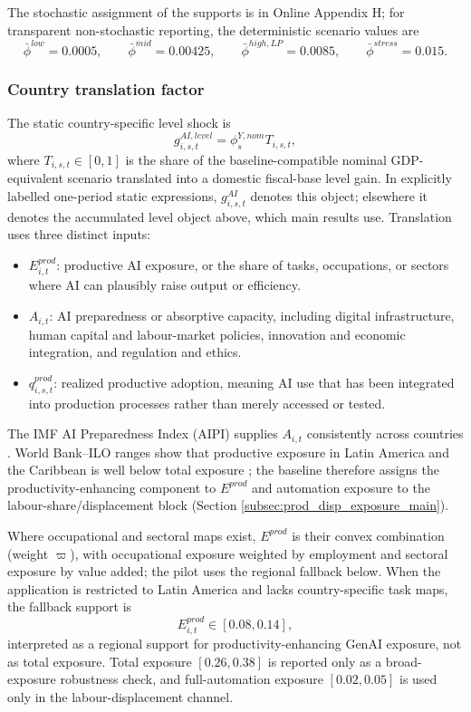 \documentclass[11pt,a4paper]{article}
\begin{document}
The stochastic assignment of the supports is in Online Appendix H; for transparent non-stochastic reporting, the deterministic scenario values are
\begin{equation}
    \bar\phi^{low}=0.0005,
    \qquad
    \bar\phi^{mid}=0.00425,
    \qquad
    \bar\phi^{high,LP}=0.0085,
    \qquad
    \bar\phi^{stress}=0.015.
\end{equation}
\subsubsection{Country translation factor}\label{subsec:translation_factor_main}

The static country-specific level shock is
\begin{equation}
    g^{AI,level}_{i,s,t}=\phi^{Y,nom}_s T_{i,s,t},
\end{equation}
where $T_{i,s,t}\in[0,1]$ is the share of the baseline-compatible nominal GDP-equivalent scenario translated into a domestic fiscal-base level gain. In explicitly labelled one-period static expressions, $g^{AI}_{i,s,t}$ denotes this object; elsewhere it denotes the accumulated level object above, which main results use. Translation uses three distinct inputs:
\begin{itemize}
    \item $E^{prod}_{i,t}$: productive AI exposure, or the share of tasks, occupations, or sectors where AI can plausibly raise output or efficiency.
    \item $A_{i,t}$: AI preparedness or absorptive capacity, including digital infrastructure, human capital and labour-market policies, innovation and economic integration, and regulation and ethics.
    \item $q^{prod}_{i,s,t}$: realized productive adoption, meaning AI use that has been integrated into production processes rather than merely accessed or tested.
\end{itemize}
The IMF AI Preparedness Index (AIPI) supplies $A_{i,t}$ consistently across countries \citep{imf2024aipi,cazzaniga2024genai}. World Bank--ILO ranges show that productive exposure in Latin America and the Caribbean is well below total exposure \citep{worldbankilo2024lacgenai}; the baseline therefore assigns the productivity-enhancing component to $E^{prod}$ and automation exposure to the labour-share/displacement block (Section \ref{subsec:prod_disp_exposure_main}).

Where occupational and sectoral maps exist, $E^{prod}$ is their convex combination (weight $\varpi$), with occupational exposure weighted by employment and sectoral exposure by value added; the pilot uses the regional fallback below.
When the application is restricted to Latin America and lacks country-specific task maps, the fallback support is
\begin{equation}
    E^{prod}_{i,t}\in[0.08,0.14],
\end{equation}
interpreted as a regional support for productivity-enhancing GenAI exposure, not as total exposure. Total exposure $[0.26,0.38]$ is reported only as a broad-exposure robustness check, and full-automation exposure $[0.02,0.05]$ is used only in the labour-displacement channel.
\end{document}
